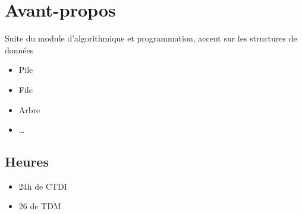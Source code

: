 \documentclass[12pt,a4paper,openany]{book}
\begin{document}
	\thispagestyle{empty} %
	\titleBC 
	\dominitoc
	\setcounter{tocdepth}{1}
	\setcounter{secnumdepth}{3}
	\setcounter{minitocdepth}{1}
	\chapter*{Avant-propos}
	Suite du module d'algorithmique et programmation, accent sur les structures de données
	\begin{itemize}
		\item Pile
		\item File
		\item Arbre
		\item \ldots
	\end{itemize}
	\section*{Heures}
	\begin{itemize}
		\item 24h de CTDI
		\item 26 de TDM
	\end{itemize}
\end{document}
